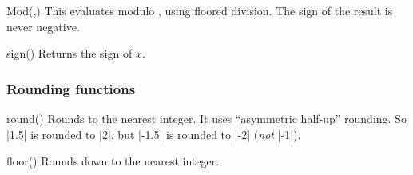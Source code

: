 \begin{math-function}{Mod(,)}
\mathcommand
    This evaluates  modulo , using floored division. The sign
    of the result is never negative.
\begin{codeexample}[]
 \pgfmathresult
\end{codeexample}
\end{math-function}

\begin{math-function}{sign()}
\mathcommand
    Returns the sign of $x$.
\begin{codeexample}[]
 \pgfmathresult
\end{codeexample}

\begin{codeexample}[]
 \pgfmathresult
\end{codeexample}

\begin{codeexample}[]
 \pgfmathresult
\end{codeexample}
\end{math-function}


\subsubsection{Rounding functions}
\label{pgfmath-functions-rounding}

\begin{math-function}{round()}
\mathcommand
    Rounds  to the nearest integer. It uses ``asymmetric half-up''
    rounding. So |1.5| is rounded to |2|, but |-1.5| is rounded to |-2|
    (\emph{not} |-1|).
\begin{codeexample}[]
 \pgfmathresult
\end{codeexample}

\begin{codeexample}[]
 \pgfmathresult
\end{codeexample}
\end{math-function}

\begin{math-function}{floor()}
\mathcommand
    Rounds  down to the nearest integer.
\begin{codeexample}[]
 \pgfmathresult
\end{codeexample}

\begin{codeexample}[]
 \pgfmathresult
\end{codeexample}

\begin{codeexample}[]
 \pgfmathresult
\end{codeexample}
\end{math-function}

